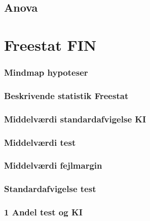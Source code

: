 \documentclass[]{book}
\begin{document}
\hypertarget{anova-1}{%
\subsection{Anova}\label{anova-1}}

\hypertarget{freestat-fin}{%
\section{Freestat FIN}\label{freestat-fin}}

\hypertarget{mindmap-hypoteser}{%
\subsubsection{Mindmap hypoteser}\label{mindmap-hypoteser}}

\hypertarget{beskrivende-statistik-freestat}{%
\subsubsection{Beskrivende statistik Freestat}\label{beskrivende-statistik-freestat}}

\hypertarget{middelvrdi-standardafvigelse-ki}{%
\subsubsection{Middelværdi standardafvigelse KI}\label{middelvrdi-standardafvigelse-ki}}

\hypertarget{middelvrdi-test}{%
\subsubsection{Middelværdi test}\label{middelvrdi-test}}

\hypertarget{middelvrdi-fejlmargin}{%
\subsubsection{Middelværdi fejlmargin}\label{middelvrdi-fejlmargin}}

\hypertarget{standardafvigelse-test}{%
\subsubsection{Standardafvigelse test}\label{standardafvigelse-test}}

\hypertarget{andel-test-og-ki}{%
\subsubsection{1 Andel test og KI}\label{andel-test-og-ki}}
\end{document}
